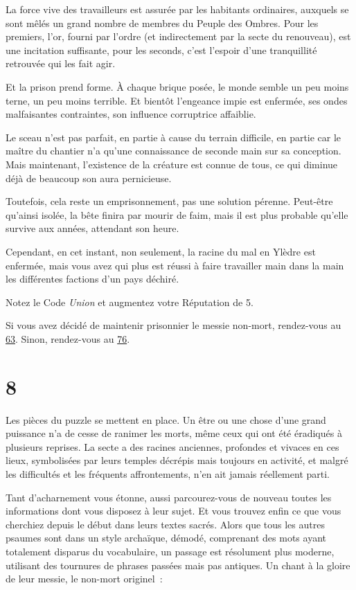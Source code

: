 \documentclass{report}
\newcommand{\gsection}[1]{
    \section{#1}
    \label{section-#1}
}
\newcommand{\glink}[1]{\hyperref[section-#1]{#1}}
\begin{document}
La force vive des travailleurs est assurée par les habitants ordinaires, auxquels se sont mêlés un grand nombre de membres du Peuple des Ombres. Pour les premiers, l'or, fourni par l'ordre (et indirectement par la secte du renouveau), est une incitation suffisante, pour les seconds, c'est l'espoir d'une tranquillité retrouvée qui les fait agir.

Et la prison prend forme. À chaque brique posée, le monde semble un peu moins terne, un peu moins terrible. Et bientôt l'engeance impie est enfermée, ses ondes malfaisantes contraintes, son influence corruptrice affaiblie.

Le sceau n'est pas parfait, en partie à cause du terrain difficile, en partie car le maître du chantier n'a qu'une connaissance de seconde main sur sa conception. Mais maintenant, l'existence de la créature est connue de tous, ce qui diminue déjà de beaucoup son aura pernicieuse.

Toutefois, cela reste un emprisonnement, pas une solution pérenne. Peut-être qu'ainsi isolée, la bête finira par mourir de faim, mais il est plus probable qu'elle survive aux années, attendant son heure.

Cependant, en cet instant, non seulement, la racine du mal en Ylèdre est enfermée, mais vous avez qui plus est réussi à faire travailler main dans la main les différentes factions d'un pays déchiré.

Notez le Code \emph{Union} et augmentez votre Réputation de 5.

Si vous avez décidé de maintenir prisonnier le messie non-mort, rendez-vous au \glink{63}. Sinon, rendez-vous au \glink{76}.

\gsection{8}

Les pièces du puzzle se mettent en place. Un être ou une chose d'une grand puissance n'a de cesse de ranimer les morts, même ceux qui ont été éradiqués à plusieurs reprises. La secte a des racines anciennes, profondes et vivaces en ces lieux, symbolisées par leurs temples décrépis mais toujours en activité, et malgré les difficultés et les fréquents affrontements, n'en ait jamais réellement parti.

Tant d'acharnement vous étonne, aussi parcourez-vous de nouveau toutes les informations dont vous disposez à leur sujet. Et vous trouvez enfin ce que vous cherchiez depuis le début dans leurs textes sacrés. Alors que tous les autres psaumes sont dans un style archaïque, démodé, comprenant des mots ayant totalement disparus du vocabulaire, un passage est résolument plus moderne, utilisant des tournures de phrases passées mais pas antiques. Un chant à la gloire de leur messie, le non-mort originel :
\end{document}
